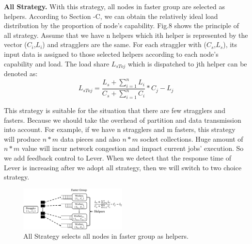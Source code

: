   \textbf{All Strategy.} With this strategy, all nodes in faster group are selected as helpers. According to Section \uppercase\expandafter{}-C, we can obtain the relatively ideal load distribution by the proportion of node's capability. Fig.8 shows the principle of all strategy. Assume that we have n helpers which ith helper is represented by the vector (\emph{$C_i$},\emph{$L_i$}) and stragglers are the same. For each straggler with (\emph{$C_s$},\emph{$L_s$}), its input data is assigned to those selected helpers according to each node's capability and load. The load share \emph{{$L_{sToj}$}} which is dispatched to jth helper can be denoted as:
  \begin{equation}
  L_{sToj} = \frac{L_s + \sum_{i=1}^n L_i}{C_s + \sum_{i=1}^n C_i}*C_j - L_j
  \end{equation}

  This strategy is suitable for the situation that there are few stragglers and fasters. Because we should take the overhead of partition and data transmission into account. For example, if we have n stragglers and m fasters, this strategy will produce $n*m$ data pieces and also $n*m$ socket collections. Huge amount of $n*m$ value will incur network congestion and impact current jobs' execution. So we add feedback control to Lever. When we detect that the response time of Lever is increasing after we adopt all strategy, then we will switch to two choice strategy.
  \begin{figure}[htbp]
    \centering
    \includegraphics[width=0.48\textwidth]{FigureS1}
    \caption{All Strategy selects all nodes in faster group as helpers.}
    \label{Fig. 8:}
  \end{figure}

